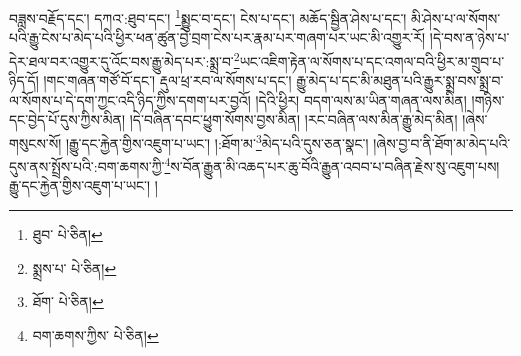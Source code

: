 བཟླས་བརྗོད་དང་། དཀའ་:ཐུབ་དང་། \footnote{ཐུབ་  པེ་ཅིན། }སྨྱུང་བ་དང་། ངེས་པ་དང་། མཆོད་སྦྱིན་ཤེས་པ་དང་། མི་ཤེས་པ་ལ་སོགས་པའི་རྒྱུ་ངེས་པ་མེད་པའི་ཕྱིར་ཕན་ཚུན་བྱེ་བྲག་ངེས་པར་རྣམ་པར་གཞག་པར་ཡང་མི་འགྱུར་རོ། །དེ་བས་ན་ཉེས་པ་དེར་ཐལ་བར་འགྱུར་དུ་འོང་བས་རྒྱུ་མེད་པར་:སྨྲ་བ་\footnote{སྨྲས་པ་  པེ་ཅིན། }ཡང་འཇིག་རྟེན་ལ་སོགས་པ་དང་འགལ་བའི་ཕྱིར་མ་གྲུབ་པ་ཉིད་དོ། །གང་གཞན་གཙོ་བོ་དང་། རྡུལ་ཕྲ་རབ་ལ་སོགས་པ་དང་། རྒྱུ་མེད་པ་དང་མི་མཐུན་པའི་རྒྱུར་སྨྲ་བས་སྨྲ་བ་ལ་སོགས་པ་དེ་དག་ཀྱང་འདི་ཉིད་ཀྱིས་དགག་པར་བྱའོ། །དེའི་ཕྱིར། བདག་ལས་མ་ཡིན་གཞན་ལས་མིན། །གཉིས་དང་བྱེད་པོ་དུས་ཀྱིས་མིན། །དེ་བཞིན་དབང་ཕྱུག་སོགས་བྱས་མིན། །རང་བཞིན་ལས་མིན་རྒྱུ་མེད་མིན། །ཞེས་གསུངས་སོ། །རྒྱུ་དང་རྐྱེན་གྱིས་འཇུག་པ་ཡང་། །:ཐོག་མ་\footnote{ཐོག་  པེ་ཅིན། }མེད་པའི་དུས་ཅན་སྣང་། །ཞེས་བྱ་བ་ནི་ཐོག་མ་མེད་པའི་དུས་ནས་སྤྲོས་པའི་:བག་ཆགས་ཀྱི་\footnote{བག་ཆགས་ཀྱིས་  པེ་ཅིན། }ས་བོན་རྒྱུན་མི་འཆད་པར་ཆུ་བོའི་རྒྱུན་འབབ་པ་བཞིན་རྗེས་སུ་འཇུག་པས། རྒྱུ་དང་རྐྱེན་གྱིས་འཇུག་པ་ཡང་། །
